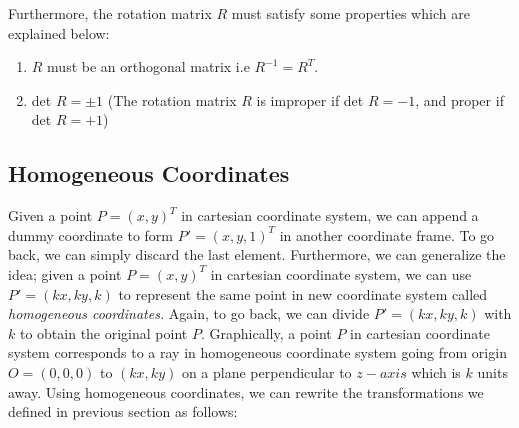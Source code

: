 \documentclass{book}
\begin{document}
\begin{enumerate}
                    Furthermore, the rotation matrix $R$ must satisfy some properties which are explained below: 
                    \begin{enumerate}
                        \item $R$ must be an orthogonal matrix i.e $R^{-1} = R^{T}$. 
                        \item det $R = \pm 1$ (The rotation matrix $R$ is improper if det $R = -1$, and proper if det $R = +1$)
                    \end{enumerate} 
                \end{enumerate}

            \subsection{Homogeneous Coordinates}
                Given a point $P = (x,y)^{T}$ in cartesian coordinate system, we can append a dummy coordinate to form $P' = (x,y,1)^{T}$
                in another coordinate frame. To go back, we can simply discard the last element. Furthermore, we can generalize the idea;
                given a point $P = (x,y)^{T}$ in cartesian coordinate system, we can use $P' = (kx, ky, k)$ to represent the same point in 
                new coordinate system called \textit{homogeneous coordinates.} Again, to go back, we can divide $P'=(kx,ky,k)$ with $k$
                to obtain the original point $P$. Graphically, a point $P$ in cartesian coordinate system corresponds to a ray in homogeneous 
                coordinate system going from origin $O = (0,0,0)$ to $(kx,ky)$ on a plane perpendicular to $z-axis$ which is $k$ units away.
                Using homogeneous coordinates, we can rewrite the transformations we defined in previous section as follows: 
\end{document}
